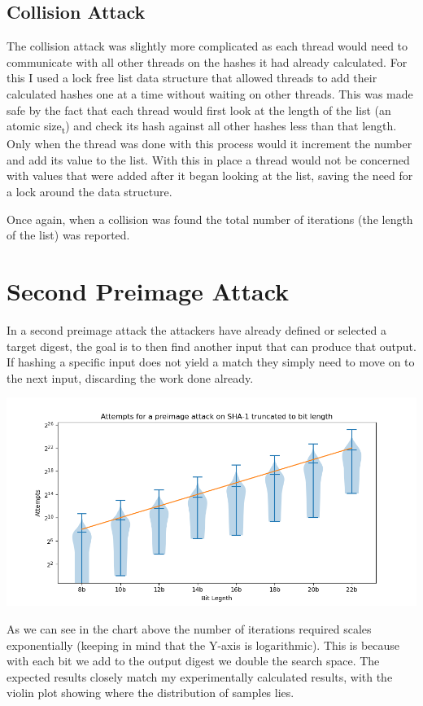 \documentclass[11pt]{article}
\begin{document}
\subsection*{Collision Attack}
\label{sec:org45eee9c}
The collision attack was slightly more complicated as each thread would need to communicate with all other threads on the hashes it had already calculated. For this I used a lock free list data structure that allowed threads to add their calculated hashes one at a time without waiting on other threads. This was made safe by the fact that each thread would first look at the length of the list (an atomic size\textsubscript{t}) and check its hash against all other hashes less than that length. Only when the thread was done with this process would it increment the number and add its value to the list. With this in place a thread would not be concerned with values that were added after it began looking at the list, saving the need for a lock around the data structure.

Once again, when a collision was found the total number of iterations (the length of the list) was reported.
\section*{Second Preimage Attack}
\label{sec:org96aff78}
In a second preimage attack the attackers have already defined or selected a target digest, the goal is to then find another input that can produce that output. If hashing a specific input does not yield a match they simply need to move on to the next input, discarding the work done already.

\begin{center}
\includegraphics[width=.9\linewidth]{preimage.png}
\end{center}

As we can see in the chart above the number of iterations required scales exponentially (keeping in mind that the Y-axis is logarithmic). This is because with each bit we add to the output digest we double the search space. The expected results closely match my experimentally calculated results, with the violin plot showing where the distribution of samples lies.
\end{document}
